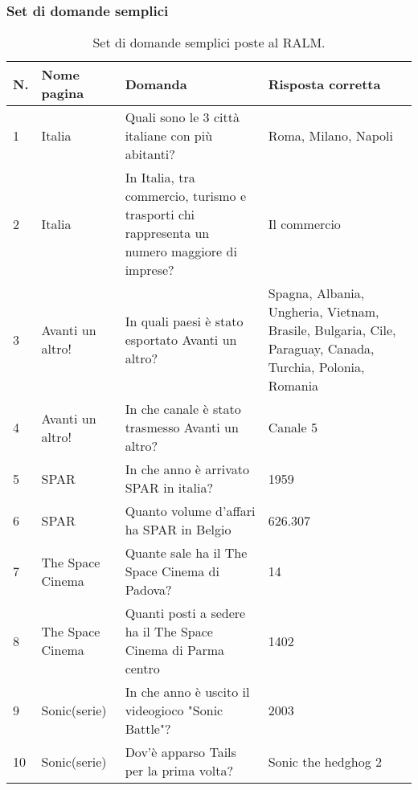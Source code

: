 \subsubsection{Set di domande semplici}
\begin{table}[H]
    \centering
    \begin{tabular}{|p{0.5cm} |p{2.5cm} |p{4cm}| p{4.5cm}|}
        \hline
        \textbf{N}. & \textbf{Nome pagina} & \textbf{Domanda} & \textbf{Risposta corretta} \\
        \hline
        1 & Italia & Quali sono le 3 città italiane con più abitanti? & Roma, Milano, Napoli \\
        \hline
        2 & Italia & In Italia, tra commercio, turismo e trasporti chi rappresenta un numero maggiore di imprese? & Il commercio \\
        \hline
        3 & Avanti un altro! & In quali paesi è stato esportato Avanti un altro? & Spagna, Albania, Ungheria, Vietnam, Brasile, Bulgaria, Cile, Paraguay, Canada, Turchia, Polonia, Romania \\
        \hline
        4 & Avanti un altro! & In che canale è stato trasmesso Avanti un altro? & Canale 5\\
        \hline
        5 & SPAR & In che anno è arrivato SPAR in italia? & 1959 \\
        \hline
        6 & SPAR & Quanto volume d'affari ha SPAR in Belgio & 626.307 \\
        \hline
        7 & The Space Cinema & Quante sale ha il The Space Cinema di Padova? & 14 \\
        \hline
        8 & The Space Cinema & Quanti posti a sedere ha il The Space Cinema di Parma centro & 1402 \\
        \hline
        9 & Sonic(serie) & In che anno è uscito il videogioco "Sonic Battle"? & 2003 \\
        \hline
        10 & Sonic(serie) & Dov'è apparso Tails per la prima volta? & Sonic the hedghog 2 \\
        \hline
    \end{tabular}
    \caption{Set di domande semplici poste al RALM.}
\end{table}

